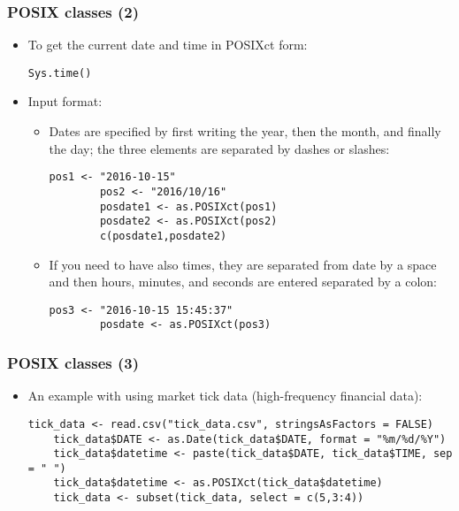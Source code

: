 \documentclass[10pt]{beamer}
\theoremstyle{definition}
\begin{document}
\begin{frame}[fragile]
\frametitle{POSIX classes (2)}
\begin{itemize}
\item To get the current date and time in POSIXct form:
	\begin{lstlisting}[style = rstyle, breaklines]
	Sys.time()
	\end{lstlisting}
	\item Input format: 
	\begin{itemize}
		\item Dates are specified by first writing the year, then the month, and finally the day; the three elements are separated by dashes or slashes:
		\begin{lstlisting}[style = rstyle, breaklines]
		pos1 <- "2016-10-15"
		pos2 <- "2016/10/16"
		posdate1 <- as.POSIXct(pos1)
		posdate2 <- as.POSIXct(pos2)
		c(posdate1,posdate2)
		\end{lstlisting} 
		\item If you need to have also times, they are separated from date by a space and then hours, minutes, and seconds are entered separated by a colon:
		\begin{lstlisting}[style = rstyle, breaklines]
		pos3 <- "2016-10-15 15:45:37"
		posdate <- as.POSIXct(pos3)
		\end{lstlisting}
	\end{itemize}	
\end{itemize} 
\end{frame}

\begin{frame}[fragile]
\frametitle{POSIX classes (3)}
\begin{itemize}
	\item An example with using market tick data (high-frequency financial data):
	\begin{lstlisting}[style = rstyle, breaklines]
	tick_data <- read.csv("tick_data.csv", stringsAsFactors = FALSE)
	tick_data$DATE <- as.Date(tick_data$DATE, format = "%m/%d/%Y")
	tick_data$datetime <- paste(tick_data$DATE, tick_data$TIME, sep = " ")
	tick_data$datetime <- as.POSIXct(tick_data$datetime)
	tick_data <- subset(tick_data, select = c(5,3:4))
	\end{lstlisting}
\end{itemize}
\end{frame}
\end{document}
